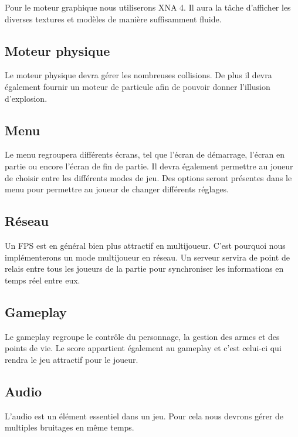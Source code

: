 \documentclass[a4paper, 11pt]{report}
\begin{document}
Pour le moteur graphique nous utiliserons XNA 4. Il aura la tâche d'afficher les diverses textures et modèles de manière suffisamment fluide.

\subsection{Moteur physique}\label{moteur-physique}

Le moteur physique devra gérer les nombreuses collisions. De plus il devra également fournir un moteur de particule afin de pouvoir donner l'illusion d'explosion.

\subsection{Menu}\label{menu}

Le menu regroupera différents écrans, tel que l'écran de démarrage, l'écran en partie ou encore l'écran de fin de partie. Il devra également permettre au joueur de choisir entre les différents modes de jeu. Des options seront présentes dans le menu pour permettre au joueur de changer différents réglages.

\subsection{Réseau}\label{ruxe9seau}

Un FPS est en général bien plus attractif en multijoueur. C'est pourquoi nous implémenterons un mode multijoueur en réseau. Un serveur servira de point de relais entre tous les joueurs de la partie pour synchroniser les informations en temps réel entre eux.

\subsection{Gameplay}\label{gameplay}

Le gameplay regroupe le contrôle du personnage, la gestion des armes et des points de vie. Le score appartient également au gameplay et c'est celui-ci qui rendra le jeu attractif pour le joueur.

\subsection{Audio}\label{audio}

L'audio est un élément essentiel dans un jeu. Pour cela nous devrons gérer de multiples bruitages en même temps.
\end{document}
